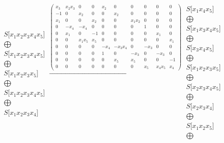 \documentclass[12pt,a3paper,landscape]{amsart}
\numberwithin{equation}{section}
\theoremstyle{plain}
\theoremstyle{definition}
\begin{document}
$$\begin{matrix}
S \lbrack x_{1}x_{2}x_{3}x_{4}x_{5} \rbrack \\ \bigoplus \\
S \lbrack x_{1}x_{2}x_{3}x_{4}x_{5} \rbrack \\ \bigoplus \\
S \lbrack x_{1}x_{2}x_{3}x_{5} \rbrack \\ \bigoplus \\
S \lbrack x_{1}x_{2}x_{3}x_{4}x_{5} \rbrack \\ \bigoplus \\
S \lbrack x_{1}x_{2}x_{3}x_{4} \rbrack
\end{matrix}
\xrightarrow{\left( \begin{matrix}
x_{3} & x_{2}x_{3} & 0 & 0 & x_{2} & 0 & 0 & 0 & 0 & 0 \\
-1 & 0 & x_{2} & 0 & 0 & x_{2} & 0 & 0 & 0 & 0 \\
x_{1} & 0 & 0 & x_{2} & 0 & 0 & x_{1}x_{2} & 0 & 0 & 0 \\
0 & -x_{4} & -x_{4} & 0 & 0 & 0 & 0 & 1 & 0 & 0 \\
0 & x_{1} & 0 & -1 & 0 & 0 & 0 & 0 & x_{1} & 0 \\
0 & 0 & x_{1}x_{5} & x_{5} & 0 & 0 & 0 & 0 & 0 & x_{1} \\
0 & 0 & 0 & 0 & -x_{4} & -x_{3}x_{4} & 0 & -x_{3} & 0 & 0 \\
0 & 0 & 0 & 0 & 1 & 0 & -x_{3} & 0 & -x_{3} & 0 \\
0 & 0 & 0 & 0 & 0 & x_{5} & x_{5} & 0 & 0 & -1 \\
0 & 0 & 0 & 0 & 0 & 0 & 0 & x_{5} & x_{4}x_{5} & x_{4}
\end{matrix} \right)}\begin{matrix}
S \lbrack x_{1}x_{4}x_{5} \rbrack \\ \bigoplus \\
S \lbrack x_{1}x_{3}x_{4}x_{5} \rbrack \\ \bigoplus \\
S \lbrack x_{3}x_{4}x_{5} \rbrack \\ \bigoplus \\
S \lbrack x_{1}x_{2}x_{3}x_{5} \rbrack \\ \bigoplus \\
S \lbrack x_{2}x_{3}x_{4}x_{5} \rbrack \\ \bigoplus \\
S \lbrack x_{2}x_{3}x_{4} \rbrack \\ \bigoplus \\
S \lbrack x_{1}x_{2}x_{5} \rbrack \\ \bigoplus \\

\end{matrix}$$
\end{document}
